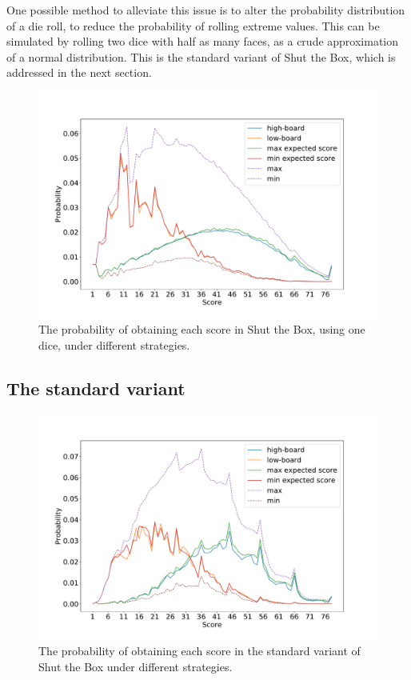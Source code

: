 One possible method to alleviate this issue is to alter the probability distribution of a die roll, to reduce the probability of rolling extreme values. This can be simulated by rolling two dice with half as many faces, as a crude approximation of a normal distribution. This is the standard variant of Shut the Box, which is addressed in the next section.

\begin{figure}[h]
    \centering
    \includegraphics[width=\textwidth]{images/ShutTheBox/stb12_1d12_prob_score.pdf}
    \caption{The probability of obtaining each score in Shut the Box, using one dice, under different strategies.}
\label{cs1:stb12_1d12_prob_score}
\end{figure}

\subsection{The standard variant}
\label{cs1:stb_standard}

\begin{figure}
    \centering
    \includegraphics[width=\textwidth]{images/ShutTheBox/stb12_2d6_prob_score.pdf}
    \caption{The probability of obtaining each score in the standard variant of Shut the Box under different strategies.}
\label{cs1:stb12_2d6_prob_score}
\end{figure}

